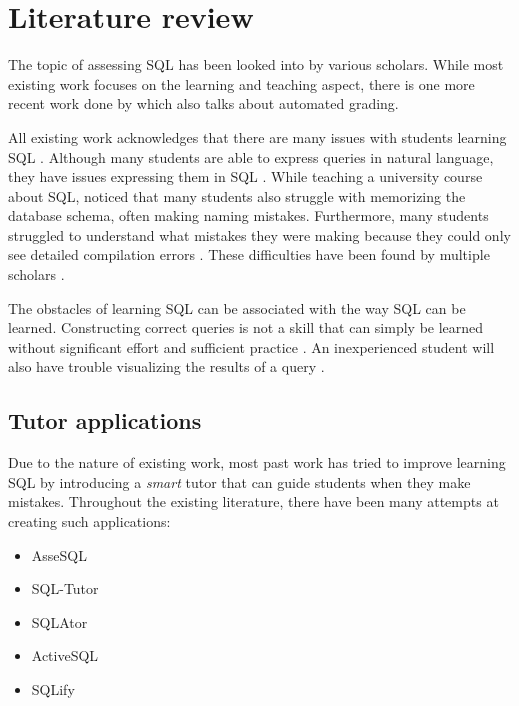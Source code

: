 \section{Literature review}

The topic of assessing SQL has been looked into by various scholars. While most existing work focuses on the learning and teaching aspect, there is one more recent work done by \cite{literature:xdata} which also talks about automated grading.

All existing work acknowledges that there are many issues with students learning SQL \citep{literature:assesql, literature:sqlify}. Although many students are able to express queries in natural language, they have issues expressing them in SQL \citep{literature:mitrovic}. While teaching a university course about SQL, \cite{literature:mitrovic} noticed that many students also struggle with memorizing the database schema, often making naming mistakes. Furthermore, many students struggled to understand what mistakes they were making because they could only see detailed compilation errors \citep{literature:mitrovic}. These difficulties have been found by multiple scholars \citep{literature:assesql, literature:sqlify, literature:kearns, literature:mitrovic}.

The obstacles of learning SQL can be associated with the way SQL can be learned. Constructing correct queries is not a skill that can simply be learned without significant effort and sufficient practice \citep{literature:assesql}. An inexperienced student will also have trouble visualizing the results of a query \citep{literature:assesql}.

\subsection{Tutor applications} \label{ch:lit:sec:tutor}

Due to the nature of existing work, most past work has tried to improve learning SQL by introducing a \textit{smart} tutor that can guide students when they make mistakes. Throughout the existing literature, there have been many attempts at creating such applications:

\begin{itemize}
    \item AsseSQL \citep{literature:assesql}
    \item SQL-Tutor \citep{literature:kearns}
    \item SQLAtor \citep{literature:sqlator}
    \item ActiveSQL \citep{literature:activesql}
    \item SQLify \citep{literature:sqlify}
\end{itemize}


